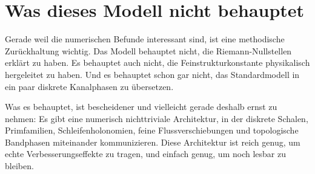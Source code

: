 \documentclass[11pt,a4paper]{article}
\theoremstyle{remark}
\begin{document}
	\section{Was dieses Modell nicht behauptet}
	
	Gerade weil die numerischen Befunde interessant sind, ist eine methodische Zurückhaltung wichtig. Das Modell behauptet nicht, die Riemann-Nullstellen erklärt zu haben. Es behauptet auch nicht, die Feinstrukturkonstante physikalisch hergeleitet zu haben. Und es behauptet schon gar nicht, das Standardmodell in ein paar diskrete Kanalphasen zu übersetzen.
	
	Was es behauptet, ist bescheidener und vielleicht gerade deshalb ernst zu nehmen: Es gibt eine numerisch nichttriviale Architektur, in der diskrete Schalen, Primfamilien, Schleifenholonomien, feine Flussverschiebungen und topologische Bandphasen miteinander kommunizieren. Diese Architektur ist reich genug, um echte Verbesserungseffekte zu tragen, und einfach genug, um noch lesbar zu bleiben.
\end{document}
